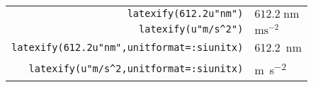 \documentclass{standalone}
\begin{document}
\begin{tabular}{rl}
        \verb+latexify(612.2u"nm")+ & $612.2\;\mathrm{nm}$\\
        \verb+latexify(u"m/s^2")+ & $\mathrm{m}\mathrm{s}^{-2}$\\
        \verb+latexify(612.2u"nm",unitformat=:siunitx)+ & \SI{612.2}{\nano\meter}\\
        \verb+latexify(u"m/s^2,unitformat=:siunitx)+ & \si{\meter\per\second\squared}\\
\end{tabular}
\end{document}
